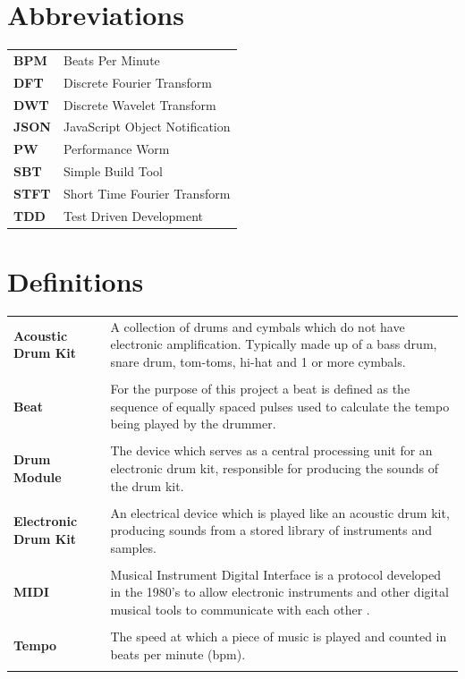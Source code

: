 \documentclass[a4paper, 11pt]{article}
\begin{document}
\maketitle
\newpage
\tableofcontents
\clearpage

\section*{Abbreviations}
\begin{tabular}{l p{4.5in}  }\\
\textbf{BPM} & Beats Per Minute\\
\textbf{DFT} & Discrete Fourier Transform\\
\textbf{DWT} & Discrete Wavelet Transform\\
\textbf{JSON} & JavaScript Object Notification\\
\textbf{PW} & Performance Worm\\
\textbf{SBT} & Simple Build Tool\\
\textbf{STFT} & Short Time Fourier Transform\\
\textbf{TDD} & Test Driven Development\\
\end{tabular}

\section*{Definitions}
\begin{tabular}{l p{4.5in}}\\
\textbf{Acoustic Drum Kit} & A collection of drums and cymbals which do not have electronic amplification. Typically made up of a bass drum, snare drum, tom-toms, hi-hat and 1 or more cymbals.\\\\
\textbf{Beat} & For the purpose of this project a beat is defined as the sequence of equally spaced pulses used to calculate the tempo being played by the drummer.\\\\
\textbf{Drum Module} & The device which serves as a central processing unit for an electronic drum kit, responsible for producing the sounds of the drum kit.\\\\
\textbf{Electronic Drum Kit} & An electrical device which is played like an acoustic drum kit, producing sounds from a stored library of instruments and samples.\\\\
\textbf{MIDI} & Musical Instrument Digital Interface is a protocol developed in the 1980's to allow electronic instruments and other digital musical tools to communicate with each other \cite{midi}.\\\\
\textbf{Tempo} & The speed at which a piece of music is played \cite{oxford-comp} and counted in beats per minute (bpm).\\\\
\end{tabular}
\clearpage
\end{document}
